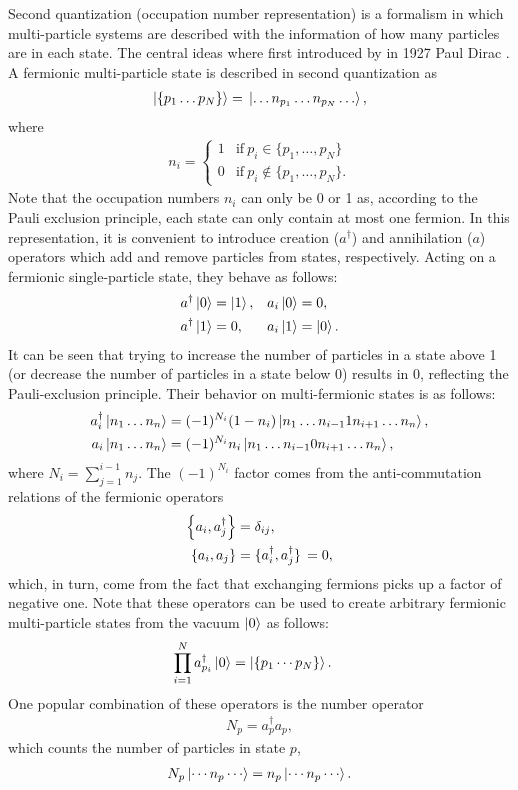 \documentclass[10pt]{article}
\newcommand{\dagg}[1]{{#1^{\dagger}}}
\begin{document}
Second quantization (occupation number representation) is a formalism in which multi-particle systems are described with the information of how many particles are in each state. The central ideas where first introduced by in 1927 Paul Dirac \cite{dirac}.  A fermionic multi-particle state is described in second quantization as
\begin{align}
\ket{\{p_1\ldots  p_N\}}
=\ket*{\ldots n_{p_1}\ldots n_{p_N}\ldots},
\end{align}
where 
\begin{align}
n_i=
\begin{cases}
1 & \text{if} \ p_i\in\{p_1,\ldots ,p_N\} \nonumber \\
0 & \text{if} \ p_i\notin\{p_1,\ldots ,p_N\}.
\end{cases}
\end{align}
Note that the occupation numbers $n_i$ can only be 0 or 1 as, according to the Pauli exclusion principle, each state can only contain at most one fermion. In this representation, it is convenient to introduce creation ($a^\dagger$) and annihilation ($a$) operators which add and remove particles from states, respectively. Acting on a fermionic single-particle state, they behave as follows:
\begin{align}
\label{new}
&\dagg{a}\ket{0}=\ket{1}, && a_i\ket{0}=0,
\\
\nonumber
&\dagg{a}\ket{1}=0, && a_i\ket{1}=\ket{0}.
\end{align}
It can be seen that trying to increase the number of particles in a state above 1 (or decrease the number of particles in a state below 0) results in 0, reflecting the Pauli-exclusion principle.
Their behavior on multi-fermionic states is as follows:
\begin{align}
\label{fermionic_op_on_states_def}
\dagg{a_i}\ket{n_1\ldots n_n}&=(-1)^{N_i}(1-n_i)\ket{n_1\ldots n_{i-1}1n_{i+1}\ldots n_n}, \\
a_i\ket{n_1\ldots n_n}&=(-1)^{N_i}n_i\ket{n_1\ldots n_{i-1}0n_{i+1}\ldots n_n},
\end{align}
where $N_i=\sum_{j=1}^{i-1}n_j$. The $(-1)^{N_i}$ factor comes from the anti-commutation relations of the fermionic operators
\begin{align}
\label{fermionic_anticommutation_relations}
\acomm{a_i}{\dagg{a_j}}&=\delta_{ij}, \\
\acomm{a_i}{a_j}&=\acomm*{\dagg{a_i}}{\dagg{a_j}}=0,
\end{align}
which, in turn, come from the fact that exchanging fermions picks up a factor of negative one. Note that these operators can be used to create arbitrary fermionic multi-particle states from the vacuum $\ket{0}$ as follows:
\begin{align}
\prod_{i=1}^Na^{\dagger}_{p_i}\ket{0}&=\ket{\{p_1\cdots p_N\}}.
\end{align}
One popular combination of these operators is the number operator
\begin{align}
N_p= a^\dagger_pa_p,
\end{align}
which counts the number of particles in state $p$,
\begin{align}
N_p\ket{\cdots n_p \cdots} = n_p\ket{\cdots n_p \cdots}.
\end{align}
\end{document}
